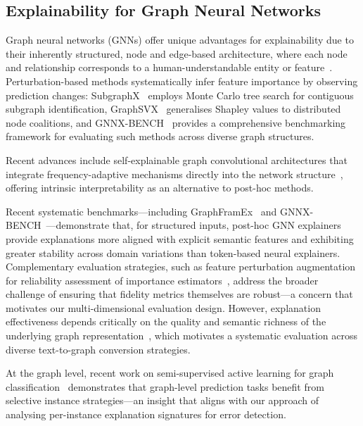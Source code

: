 \documentclass[preprint, times, review, 10pt]{elsarticle}
\begin{document}
\subsection{Explainability for Graph Neural Networks} \label{explainability_graphs}

Graph neural networks (GNNs) offer unique advantages for explainability due to their inherently structured, node and edge-based architecture, where each node and relationship corresponds to a human-understandable entity or feature~\cite{agarwal2023graphxai}. Perturbation-based methods systematically infer feature importance by observing prediction changes: SubgraphX~\cite{yuan2021explainabilitygraphneuralnetworks} employs Monte Carlo tree search for contiguous subgraph identification, GraphSVX~\cite{duval2021graphsvxshapleyvalueexplanations} generalises Shapley values to distributed node coalitions, and GNNX-BENCH~\cite{kosan2024gnnxbenchunravellingutilityperturbationbased} provides a comprehensive benchmarking framework for evaluating such methods across diverse graph structures.

Recent advances include self-explainable graph convolutional architectures that integrate frequency-adaptive mechanisms directly into the network structure~\cite{wei2024selfexplainable}, offering intrinsic interpretability as an alternative to post-hoc methods.

Recent systematic benchmarks---including GraphFramEx~\cite{amara2022graphframex} and GNNX-BENCH~\cite{kosan2024gnnxbenchunravellingutilityperturbationbased}---demonstrate that, for structured inputs, post-hoc GNN explainers provide explanations more aligned with explicit semantic features and exhibiting greater stability across domain variations than token-based neural explainers. Complementary evaluation strategies, such as feature perturbation augmentation for reliability assessment of importance estimators~\cite{brocki2023fpa}, address the broader challenge of ensuring that fidelity metrics themselves are robust—a concern that motivates our multi-dimensional evaluation design. However, explanation effectiveness depends critically on the quality and semantic richness of the underlying graph representation~\cite{xue2025llm-gnn-xai}, which motivates a systematic evaluation across diverse text-to-graph conversion strategies.

At the graph level, recent work on semi-supervised active learning for graph classification~\cite{ju2024graphspa} demonstrates that graph-level prediction tasks benefit from selective instance strategies—an insight that aligns with our approach of analysing per-instance explanation signatures for error detection.
\end{document}

